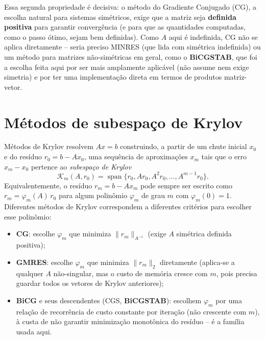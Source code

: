 \documentclass[11pt,a4paper]{article}
\begin{document}
Essa segunda propriedade é decisiva: o método do Gradiente Conjugado
(CG), a escolha natural para sistemas simétricos, exige que a matriz
seja \textbf{definida positiva} para garantir convergência (e para que
as quantidades computadas, como o passo ótimo, sejam bem definidas). Como
$A$ aqui é indefinida, CG não se aplica diretamente -- seria preciso
MINRES (que lida com simétrica indefinida) ou um método para matrizes
não-simétricas em geral, como o \textbf{BiCGSTAB}, que foi a escolha
feita aqui por ser mais amplamente aplicável (não assume nem exige
simetria) e por ter uma implementação direta em termos de produtos
matriz-vetor.

\section{Métodos de subespaço de Krylov}

Métodos de Krylov resolvem $Ax=b$ construindo, a partir de um chute
inicial $x_0$ e do resíduo $r_0 = b - Ax_0$, uma sequência de
aproximações $x_m$ tais que o erro $x_m - x_0$ pertence ao
\emph{subespaço de Krylov}
\begin{equation}
  \mathcal{K}_m(A, r_0) = \operatorname{span}\{r_0, Ar_0, A^2r_0,
  \dots, A^{m-1}r_0\}.
\end{equation}
Equivalentemente, o resíduo $r_m = b - Ax_m$ pode sempre ser escrito
como $r_m = \varphi_m(A)\,r_0$ para algum polinômio $\varphi_m$ de grau
$m$ com $\varphi_m(0)=1$. Diferentes métodos de Krylov correspondem a
diferentes critérios para escolher esse polinômio:

\begin{itemize}
  \item \textbf{CG}: escolhe $\varphi_m$ que minimiza $\|r_m\|_{A^{-1}}$
    (exige $A$ simétrica definida positiva);
  \item \textbf{GMRES}: escolhe $\varphi_m$ que minimiza $\|r_m\|_2$
    diretamente (aplica-se a qualquer $A$ não-singular, mas o custo de
    memória cresce com $m$, pois precisa guardar todos os vetores de
    Krylov anteriores);
  \item \textbf{BiCG} e seus descendentes (CGS, \textbf{BiCGSTAB}):
    escolhem $\varphi_m$ por uma relação de recorrência de custo
    constante por iteração (não crescente com $m$), à custa de não
    garantir minimização monotônica do resíduo -- é a família usada
    aqui.
\end{itemize}
\end{document}
